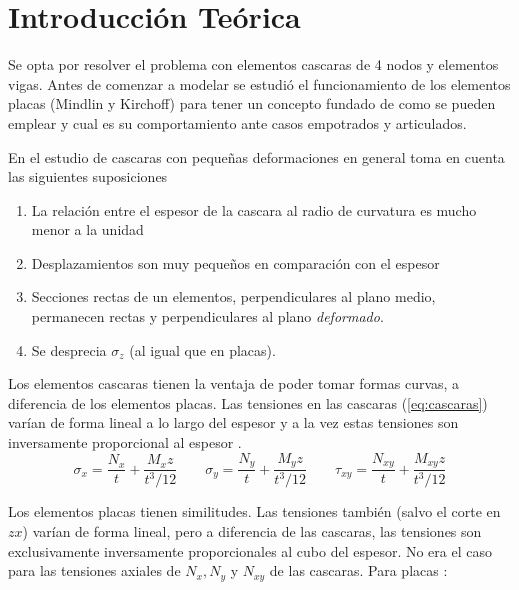 \documentclass[onecolumn,10pt,titlepage]{article}
\begin{document}
\tableofcontents


\section{Introducción Teórica}
Se opta por resolver el problema con elementos cascaras de 4 nodos y elementos vigas. Antes de comenzar a modelar se estudió el funcionamiento de los elementos placas (Mindlin y Kirchoff) para tener un concepto fundado de como se pueden emplear y cual es su comportamiento ante casos empotrados y articulados.

En el estudio de cascaras con pequeñas deformaciones en general toma en cuenta las siguientes suposiciones\cite{ugural2003advanced}

\begin{enumerate}
	\item La relación entre el espesor de la cascara al radio de curvatura es mucho menor a la unidad
	\item Desplazamientos son muy pequeños en comparación con el espesor
	\item Secciones rectas de un elementos, perpendiculares al plano medio, permanecen rectas y perpendiculares al plano \textit{deformado}.
	\item Se desprecia $\sigma_z$ (al igual que en placas).
\end{enumerate}


Los elementos cascaras tienen la ventaja de poder tomar formas curvas, a diferencia de los elementos placas. Las tensiones en las cascaras (\ref{eq:cascaras}) varían de forma lineal a lo largo del espesor y a la vez estas tensiones son inversamente proporcional al espesor \citep{cook2007concepts}.\\
\begin{equation} \label{eq:cascaras}
\sigma_{x}=\frac{N_{x}}{t}+\frac{M_{x} z}{t^{3} / 12} \qquad \sigma_{y}=\frac{N_{y}}{t}+\frac{M_{y} z}{t^{3} / 12} \qquad \tau_{x y}=\frac{N_{x y}}{t}+\frac{M_{x y} z}{t^{3} / 12}
\end{equation}

Los elementos placas tienen similitudes. Las tensiones también (salvo el corte en $zx$) varían de forma lineal, pero a diferencia de las cascaras, las tensiones son exclusivamente inversamente proporcionales al cubo del espesor. No era el caso para las tensiones axiales de $N_x,N_y$ y $N_{xy}$ de las cascaras. Para placas \citep{ugural2003advanced}:
\end{document}
